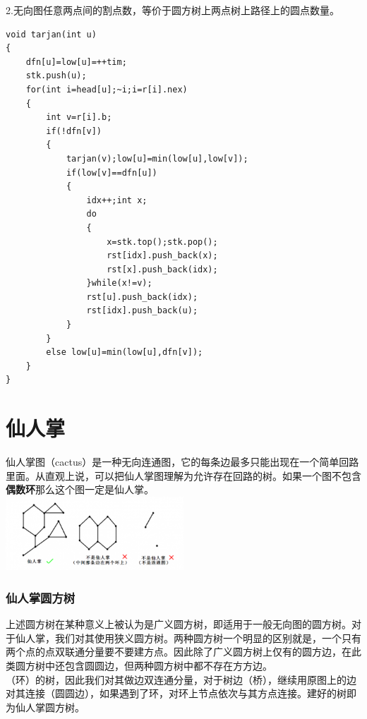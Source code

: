 \documentclass[a4paper]{book}
\begin{document}
\indent2.无向图任意两点间的割点数，等价于圆方树上两点树上路径上的圆点数量。
\begin{lstlisting}
void tarjan(int u)
{
    dfn[u]=low[u]=++tim;
    stk.push(u);
    for(int i=head[u];~i;i=r[i].nex)
    {
        int v=r[i].b;
        if(!dfn[v])
        {
            tarjan(v);low[u]=min(low[u],low[v]);
            if(low[v]==dfn[u])
            {
                idx++;int x;
                do
                {
                    x=stk.top();stk.pop();
                    rst[idx].push_back(x);
                    rst[x].push_back(idx);
                }while(x!=v);
                rst[u].push_back(idx);
                rst[idx].push_back(u);
            }
        }
        else low[u]=min(low[u],dfn[v]);
    }
}
\end{lstlisting}
\section{仙人掌}
仙人掌图（cactus）是一种无向连通图，它的每条边最多只能出现在一个简单回路里面。从直观上说，可以把仙人掌图理解为允许存在回路的树。如果一个图不包含\textbf{偶数环}那么这个图一定是仙人掌。\\
\includegraphics[width=0.5\textwidth,center]{../photo/xrz.png}
\subsubsection{仙人掌圆方树}
上述圆方树在某种意义上被认为是广义圆方树，即适用于一般无向图的圆方树。对于仙人掌，我们对其使用狭义圆方树。两种圆方树一个明显的区别就是，一个只有两个点的点双联通分量要不要建方点。因此除了广义圆方树上仅有的圆方边，在此类圆方树中还包含圆圆边，但两种圆方树中都不存在方方边。\\
（环）的树，因此我们对其做边双连通分量，对于树边（桥），继续用原图上的边对其连接（圆圆边），如果遇到了环，对环上节点依次与其方点连接。建好的树即为仙人掌圆方树。\\
\end{document}
